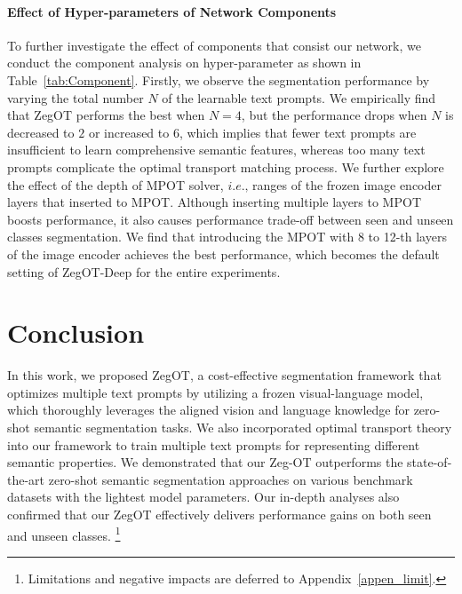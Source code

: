 \documentclass[nohyperref]{article}
\theoremstyle{plain}
\theoremstyle{definition}
\theoremstyle{remark}
\begin{document}
\paragraph{Effect of Hyper-parameters of Network Components}
To further investigate the effect of components that consist our network, we conduct the component analysis on hyper-parameter as shown in Table~\ref{tab:Component}.
Firstly, we observe the segmentation performance by varying the total number $N$ of the learnable text prompts.
We empirically find that ZegOT performs the best when $N=4$, but the performance drops when $N$ is decreased to $2$ or increased to $6$, which implies that fewer text prompts are insufficient to learn comprehensive semantic features, whereas too many text prompts complicate the optimal transport matching process.
We further explore the effect of the depth of MPOT solver, $\textit{i.e.,}$ ranges of the frozen image encoder layers that inserted to MPOT.
Although inserting multiple layers to MPOT boosts performance, 
it also causes performance trade-off between seen and unseen classes segmentation.
We find that introducing the MPOT with 8 to 12-th layers of the image encoder achieves the best performance, which becomes %
the default setting of ZegOT-Deep for the entire experiments.

\section{Conclusion}
In this work, we proposed ZegOT, a cost-effective segmentation framework that optimizes multiple text prompts by utilizing a frozen visual-language model, which thoroughly leverages the aligned vision and language knowledge for zero-shot semantic segmentation tasks. 
We also incorporated optimal transport theory into our framework to train multiple text prompts for representing different semantic properties. 
We demonstrated that our Zeg-OT outperforms the state-of-the-art zero-shot semantic segmentation approaches on various benchmark datasets with the lightest model parameters. 
Our in-depth analyses also confirmed that our ZegOT effectively delivers performance gains on both seen and unseen classes. \footnote{Limitations and negative impacts are deferred to Appendix~\ref{appen_limit}.}
\end{document}
